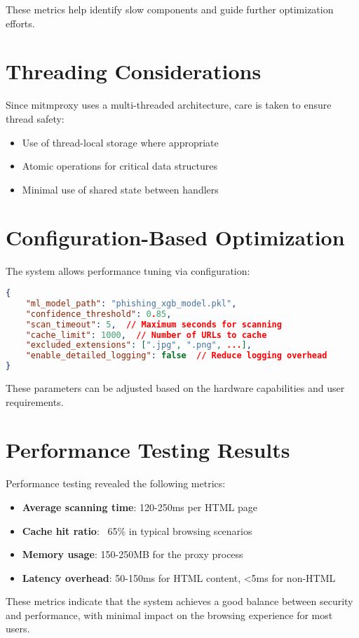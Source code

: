 These metrics help identify slow components and guide further optimization efforts.

\section{Threading Considerations}

Since mitmproxy uses a multi-threaded architecture, care is taken to ensure thread safety:

\begin{itemize}
    \item Use of thread-local storage where appropriate
    \item Atomic operations for critical data structures
    \item Minimal use of shared state between handlers
\end{itemize}

\section{Configuration-Based Optimization}

The system allows performance tuning via configuration:

\begin{lstlisting}[language=JSON, caption=Performance Configuration]
{
    "ml_model_path": "phishing_xgb_model.pkl",
    "confidence_threshold": 0.85,
    "scan_timeout": 5,  // Maximum seconds for scanning
    "cache_limit": 1000,  // Number of URLs to cache
    "excluded_extensions": [".jpg", ".png", ...],
    "enable_detailed_logging": false  // Reduce logging overhead
}
\end{lstlisting}

These parameters can be adjusted based on the hardware capabilities and user requirements.

\section{Performance Testing Results}

Performance testing revealed the following metrics:

\begin{itemize}
    \item \textbf{Average scanning time}: 120-250ms per HTML page
    \item \textbf{Cache hit ratio}: ~65\% in typical browsing scenarios
    \item \textbf{Memory usage}: 150-250MB for the proxy process
    \item \textbf{Latency overhead}: 50-150ms for HTML content, <5ms for non-HTML
\end{itemize}

These metrics indicate that the system achieves a good balance between security and performance, with minimal impact on the browsing experience for most users.
